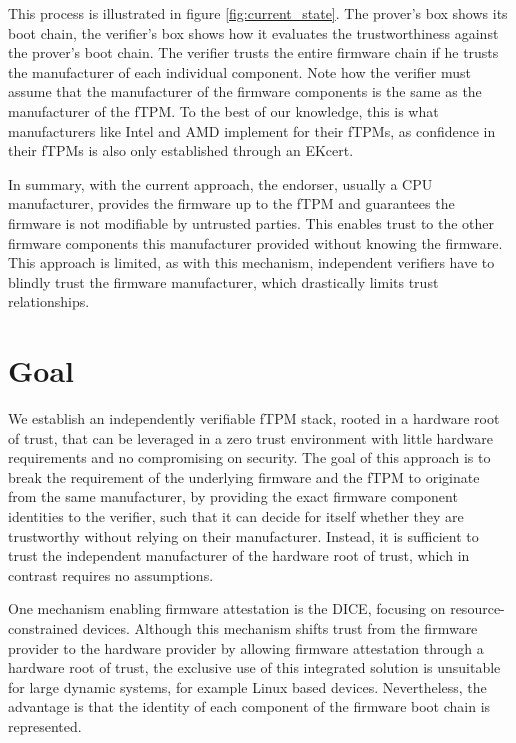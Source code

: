 

This process is illustrated in figure \autoref{fig:current_state}.
The prover's box shows its boot chain, the verifier's box shows how it evaluates the trustworthiness against the prover's boot chain.
The verifier trusts the entire firmware chain if he trusts the manufacturer of each individual component.
Note how the verifier must assume that the manufacturer of the firmware components is the same as the manufacturer of the fTPM\@.
To the best of our knowledge, this is what manufacturers like Intel and AMD implement for their \acp{fTPM}, as confidence in their \acp{fTPM} is also only established through an EKcert.


In summary, with the current approach, the endorser, usually a CPU manufacturer, provides the firmware up to the fTPM and guarantees the firmware is not modifiable by untrusted parties.
This enables trust to the other firmware components this manufacturer provided without knowing the firmware.
This approach is limited, as with this mechanism, independent verifiers have to blindly trust the firmware manufacturer, which drastically limits trust relationships.

\section{Goal}

We establish an independently verifiable fTPM stack, rooted in a hardware root of trust, that can be leveraged in a zero trust environment with little hardware requirements and no compromising on security.
The goal of this approach is to break the requirement of the underlying firmware and the fTPM to originate from the same manufacturer, by providing the exact firmware component identities to the verifier, such that it can decide for itself whether they are trustworthy without relying on their manufacturer.
Instead, it is sufficient to trust the independent manufacturer of the hardware root of trust, which in contrast requires no assumptions.


One mechanism enabling firmware attestation is the \ac{DICE}, focusing on resource-constrained devices.
Although this mechanism shifts trust from the firmware provider to the hardware provider by allowing firmware attestation through a hardware root of trust, the exclusive use of this integrated solution is unsuitable for large dynamic systems, for example Linux based devices.
Nevertheless, the advantage is that the identity of each component of the firmware boot chain is represented.

